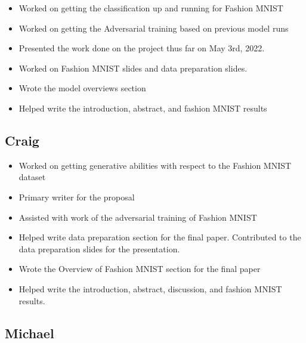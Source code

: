 \documentclass[conference]{IEEEtran}
\begin{document}
\begin{itemize}
    \item Worked on getting the classification up and running for Fashion MNIST
    \item Worked on getting the Adversarial training based on previous model runs
    \item Presented the work done on the project thus far on May 3rd, 2022.
    \item Worked on Fashion MNIST slides and data preparation slides.
    \item Wrote the model overviews section
    \item Helped write the introduction, abstract, and fashion MNIST results
\end{itemize}

\subsection{Craig} 

\begin{itemize}
    \item Worked on getting generative abilities with respect to the Fashion MNIST dataset
    \item Primary writer for the proposal
    \item Assisted with work of the adversarial training of Fashion MNIST
    \item Helped write data preparation section for the final paper. Contributed to the data preparation slides for the presentation.
    \item Wrote the Overview of Fashion MNIST section for the final paper
    \item Helped write the introduction, abstract, discussion, and fashion MNIST results.
\end{itemize}

\subsection{Michael} 
\end{document}
